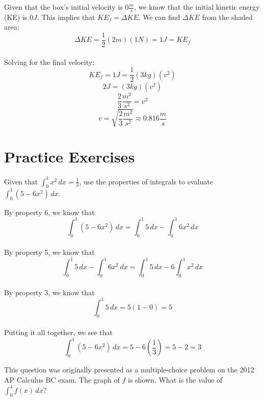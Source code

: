 Given that the box's initial velocity is $0\frac{m}{s}$, we know that the initial kinetic energy (KE) is $0J$. This implies that $KE_f=\Delta KE$. We can find $\Delta KE$ from the shaded area:\\
$$\Delta KE = \frac{1}{2}(2m)(1N)=1 J=KE_f$$\\
Solving for the final velocity:\\
$$KE_f = 1 J = \frac{1}{2}(3kg)(v^2)$$
$$2 J = (3 kg)(v^2)$$
$$\frac{2}{3}\frac{m^2}{s^2}=v^2$$
$$v=\sqrt{\frac{2}{3}\frac{m^2}{s^2}}\approx0.816 \frac{m}{s}$$


\section{Practice Exercises}
\begin{Exercise}[label=defint2]
Given that $\int_{0}^{1}x^2\,dx=\frac{1}{3}$, use the properties of integrals to evaluate $\int_{0}^{1}(5-6x^2)\,dx$. 
\end{Exercise}

\begin{Answer}[ref=defint2]
By property 6, we know that $$\int_{0}^{1}(5-6x^2)\,dx=\int_{0}^{1}5\,dx-\int_{0}^{1}6x^2\,dx$$\\
By property 5, we know that $$\int_{0}^{1}5\,dx-\int_{0}^{1}6x^2\,dx=\int_{0}^{1}5\,dx-6\int_{0}^{1}x^2\,dx$$\\
By property 3, we know that $$\int_{0}^{1}5\,dx = 5(1-0) = 5$$\\
Putting it all together, we see that $$\int_{0}^{1}(5-6x^2)\,dx=5-6(\frac{1}{3})=5-2=3$$
\end{Answer}

\begin{Exercise}[label=defint3]
	This question was originally presented as a multiple-choice problem on the 2012 AP Calculus BC exam. The graph of $f$ is shown. What is the value of $\int_{0}^{4}f(x)\,dx$?\\
\end{Exercise}

